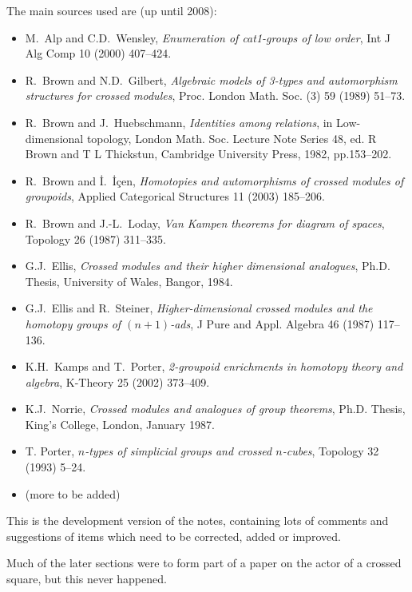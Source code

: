 \bigskip
The main sources used are (up until 2008):
\begin{itemize}
\item
M.~Alp and C.D.~Wensley,
\emph{Enumeration of cat1-groups of low order},
Int J Alg Comp 10 (2000) 407--424.

\item
R.~Brown and N.D.~Gilbert,
\emph{Algebraic models of 3-types and automorphism
structures for crossed modules},
Proc. London Math. Soc. (3) 59 (1989) 51--73.
\item
R.~Brown and J.~Huebschmann, \emph{Identities among relations},
in Low-dimensional topology, London Math. Soc. Lecture Note Series 48,
ed. R Brown and T L Thickstun, Cambridge University Press, 1982, pp.153--202.

\item
R.~Brown and  \.{I}.~\.{I}\c{c}en,
\emph{Homotopies and automorphisms of crossed modules of groupoids},
Applied Categorical Structures 11 (2003) 185--206.

\item
R.~Brown and  J.-L.~Loday,
\emph{Van Kampen theorems for diagram of spaces},
Topology 26 (1987) 311--335.

\item
G.J.~Ellis, 
\emph{Crossed modules and their higher dimensional analogues},
Ph.D. Thesis, University of Wales, Bangor, 1984.

\item
G.J.~Ellis and R.~Steiner,
\emph{Higher-dimensional crossed modules and the
homotopy groups of $(n+1)$-ads},
J Pure and Appl. Algebra 46 (1987) 117--136.

\item
K.H.~Kamps and T.~Porter,
\emph{2-groupoid enrichments in homotopy theory and algebra},
K-Theory 25 (2002) 373--409.

\item
K.J.~Norrie, 
\emph{Crossed modules and analogues of group theorems},
Ph.D. Thesis, King's College, London, January 1987.

\item
T. Porter,
\emph{$n$-types of simplicial groups and crossed $n$-cubes},
Topology 32 (1993) 5--24.

\item
(more to be added)
\end{itemize}

\bigskip

This is the development version of the notes, containing lots of
comments and suggestions of items which need to be corrected, added
or improved.

Much of the later sections were to form part of a paper 
on the actor of a crossed square, but this never happened. 
